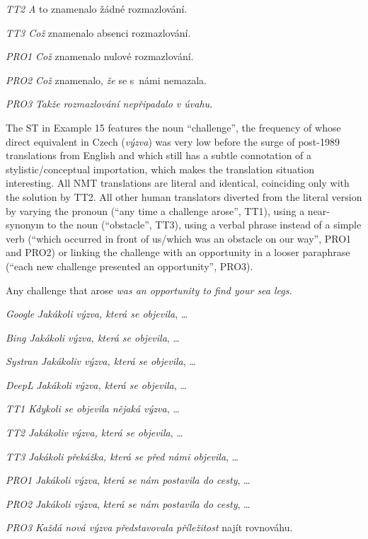 \documentclass[output=paper]{langscibook}
\begin{document}
\textit{TT2} \textit{A} to znamenalo žádné rozmazlování.

\textit{TT3 Což} znamenalo absenci rozmazlování.

\textit{PRO1} \textit{Což} znamenalo nulové rozmazlování.

\textit{PRO2} \textit{Což} znamenalo, \textit{že} se s~námi nemazala.

\textit{PRO3} \textit{Takže rozmazlování nepřipadalo v úvahu.}

\z
The ST in Example 15 features the noun “challenge”, the frequency of whose direct equivalent in Czech (\textit{výzva}) was very low before the surge of post-1989 translations from English and which still has a subtle connotation of a stylistic/conceptual importation, which makes the translation situation interesting. All NMT translations are literal and identical, coinciding only with the solution by TT2. All other human translators diverted from the literal version by varying the pronoun (“any time a challenge arose”, TT1), using a near-synonym to the noun (“obstacle”, TT3), using a verbal phrase instead of a simple verb (“which occurred in front of us/which was an obstacle on our way”, PRO1 and PRO2) or linking the challenge with an opportunity in a looser paraphrase (“each new challenge presented an opportunity”, PRO3).

\ea \label{ex:kamenicka:11}

Any challenge that arose \textit{was an opportunity to find your sea legs.}

\textit{Google} \textit{Jakákoli výzva, která se objevila}, …

\textit{Bing Jakákoli výzva, která se objevila}, …

\textit{Systran} \textit{Jakákoliv výzva, která se objevila}, …

\textit{DeepL} \textit{Jakákoli výzva, která se objevila}, …

\textit{TT1 Kdykoli se objevila nějaká výzva}, …

\textit{TT2} \textit{Jakákoliv výzva, která se objevila}, …

\textit{TT3} \textit{Jakákoli} \textit{překážka, která se před námi objevila}, …

\textit{PRO1} \textit{Jakákoli výzva}, \textit{která se nám postavila do cesty}, …

\textit{PRO2} \textit{Jakákoli výzva}, \textit{která se nám postavila do cesty}, …

\textit{PRO3} \textit{Každá nová výzva představovala příležitost} najít rovnováhu.
\end{document}
